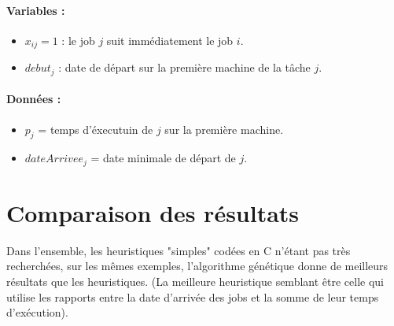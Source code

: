 \documentclass[11pt]{article} %
\let\stdpart\part
\renewcommand\part{\newpage\setcounter{section}{0}\stdpart}
\begin{document}
\paragraph{Variables :}

\begin{itemize}
	\item $x_{ij} = 1$ : le job $j$ suit immédiatement le job $i$.
	\item $debut_j$ : date de départ sur la première machine de la tâche $j$.
\end{itemize}

\paragraph{Données :}

\begin{itemize}
	\item $p_j$ = temps d'éxecutuin de $j$ sur la première machine.
	\item $dateArrivee_j$ = date minimale de départ de $j$.
\end{itemize}

\section{Comparaison des résultats}

Dans l'ensemble, les heuristiques "simples" codées en C n'étant pas très recherchées, sur les mêmes exemples, l'algorithme génétique donne de meilleurs résultats que les heuristiques. (La meilleure heuristique semblant être celle qui utilise les rapports entre la date d'arrivée des jobs et la somme de leur temps d'exécution).


\end{document}
